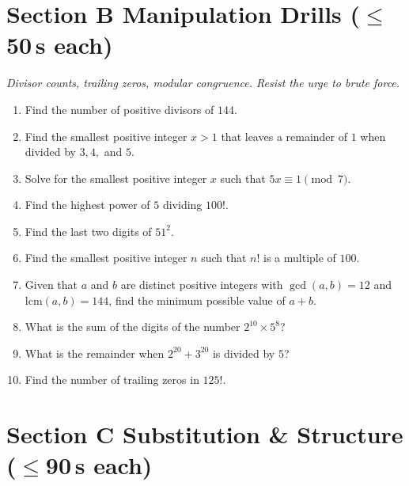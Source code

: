 \documentclass[11pt,a4paper]{article}
\begin{document}
\section*{Section B \quad Manipulation Drills \hfill{\normalfont\small($\leq$50\,s each)}}

\noindent\textit{Divisor counts, trailing zeros, modular congruence. Resist the urge to brute force.}

\begin{enumerate}

\item Find the number of positive divisors of $144$.

\item Find the smallest positive integer $x > 1$ that leaves a remainder of $1$ when divided by $3, 4,$ and $5$.

\item Solve for the smallest positive integer $x$ such that $5x \equiv 1 \pmod 7$.

\item Find the highest power of $5$ dividing $100!$.

\item Find the last two digits of $51^2$.

\item Find the smallest positive integer $n$ such that $n!$ is a multiple of $100$.

\item Given that $a$ and $b$ are distinct positive integers with $\gcd(a, b) = 12$ and $\text{lcm}(a, b) = 144$, find the minimum possible value of $a+b$.

\item What is the sum of the digits of the number $2^{10} \times 5^{8}$?

\item What is the remainder when $2^{20} + 3^{20}$ is divided by $5$?

\item Find the number of trailing zeros in $125!$.

\end{enumerate}

\section*{Section C \quad Substitution \& Structure \hfill{\normalfont\small($\leq$90\,s each)}}
\end{document}
